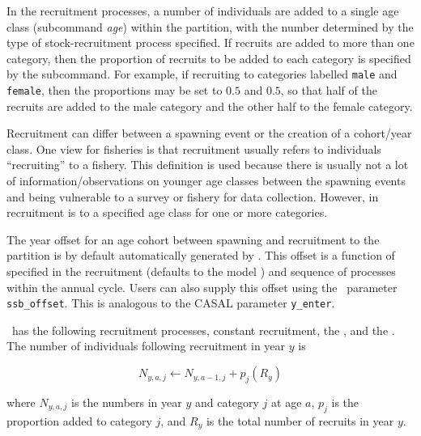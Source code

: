 In the recruitment processes, a number of individuals are added to a single age class (subcommand \textit{age}) within the partition, with the number determined by the type of stock-recruitment process specified. If recruits are added to more than one category, then the proportion of recruits to be added to each category is specified by the  subcommand. For example, if recruiting to categories labelled \texttt{male} and \texttt{female}, then the proportions may be set to $0.5$ and $0.5$, so that half of the recruits are added to the male category and the other half to the female category.

Recruitment can differ between a spawning event or the creation of a cohort/year class. One view for fisheries is that recruitment usually refers to individuals \enquote{recruiting} to a fishery. This definition is used because there is usually not a lot of information/observations on younger age classes between the spawning events and being vulnerable to a survey or fishery for data collection. However, in \CNAME\, recruitment is to a specified age class for one or more categories.

The year offset for an age cohort between spawning and recruitment to the partition is by default automatically generated by \CNAME. This offset is a function of  specified in the recruitment  (defaults to the model ) and sequence of processes within the annual cycle. Users can also supply this offset using the \CNAME\ parameter \texttt{ssb\_offset}. This is analogous to the CASAL parameter \texttt{y\_enter}.

\CNAME\ has the following recruitment processes, constant recruitment, the  \citep{1203}, and the . The  number of individuals following recruitment in year $y$ is

\begin{equation}
N_{y,a,j} \leftarrow N_{y,a - 1,j} + p_j(R_y)
\end{equation}

where $N_{y,a,j}$ is the numbers in year $y$ and category $j$ at age $a$, $p_j$ is the proportion added to category $j$, and $R_y$ is the total number of recruits in year $y$.

\paragraph{}\label{sec:Process-RecruitmentConstant}

